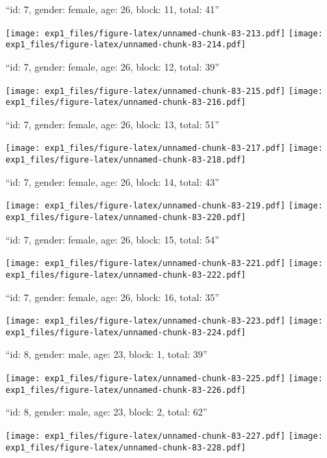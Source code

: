 \documentclass[11pt,,]{article}
\begin{document}
\newpage
[1] 

``id: 7, gender: female, age: 26, block: 11, total: 41''

\texttt{[image: exp1\_files/figure-latex/unnamed-chunk-83-213.pdf]}
\texttt{[image: exp1\_files/figure-latex/unnamed-chunk-83-214.pdf]}

\newpage
[1] 

``id: 7, gender: female, age: 26, block: 12, total: 39''

\texttt{[image: exp1\_files/figure-latex/unnamed-chunk-83-215.pdf]}
\texttt{[image: exp1\_files/figure-latex/unnamed-chunk-83-216.pdf]}

\newpage
[1] 

``id: 7, gender: female, age: 26, block: 13, total: 51''

\texttt{[image: exp1\_files/figure-latex/unnamed-chunk-83-217.pdf]}
\texttt{[image: exp1\_files/figure-latex/unnamed-chunk-83-218.pdf]}

\newpage
[1] 

``id: 7, gender: female, age: 26, block: 14, total: 43''

\texttt{[image: exp1\_files/figure-latex/unnamed-chunk-83-219.pdf]}
\texttt{[image: exp1\_files/figure-latex/unnamed-chunk-83-220.pdf]}

\newpage
[1] 

``id: 7, gender: female, age: 26, block: 15, total: 54''

\texttt{[image: exp1\_files/figure-latex/unnamed-chunk-83-221.pdf]}
\texttt{[image: exp1\_files/figure-latex/unnamed-chunk-83-222.pdf]}

\newpage
[1] 

``id: 7, gender: female, age: 26, block: 16, total: 35''

\texttt{[image: exp1\_files/figure-latex/unnamed-chunk-83-223.pdf]}
\texttt{[image: exp1\_files/figure-latex/unnamed-chunk-83-224.pdf]}

\newpage
[1] 

``id: 8, gender: male, age: 23, block: 1, total: 39''

\texttt{[image: exp1\_files/figure-latex/unnamed-chunk-83-225.pdf]}
\texttt{[image: exp1\_files/figure-latex/unnamed-chunk-83-226.pdf]}

\newpage
[1] 

``id: 8, gender: male, age: 23, block: 2, total: 62''

\texttt{[image: exp1\_files/figure-latex/unnamed-chunk-83-227.pdf]}
\texttt{[image: exp1\_files/figure-latex/unnamed-chunk-83-228.pdf]}
\end{document}
